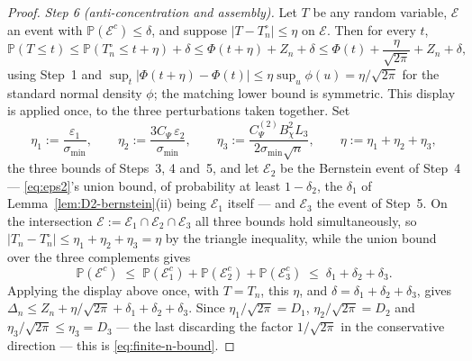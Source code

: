 \documentclass[11pt]{article}
\theoremstyle{plain}
\theoremstyle{definition}
\theoremstyle{remark}
\newcommand{\PP}{\mathbb{P}}
\begin{document}
\begin{proof}
\emph{Step 6 (anti-concentration and assembly).} Let $T$ be any random variable,
$\mathcal E$ an event with $\PP(\mathcal E^c)\le\delta$, and suppose
$|T-T_n^\circ|\le\eta$ on $\mathcal E$. Then for every $t$,
\[
    \PP(T\le t)\le\PP(T_n^\circ\le t+\eta)+\delta\le\Phi(t+\eta)+Z_n+\delta\le\Phi(t)+\frac\eta{\sqrt{2\pi}}+Z_n+\delta,
\]
using Step~1 and $\sup_t|\Phi(t+\eta)-\Phi(t)|\le\eta\sup_u\phi(u)=\eta/\sqrt{2\pi}$ for
the standard normal density $\phi$; the matching lower bound is symmetric. This display is
applied once, to the three perturbations taken together. Set
\[
    \eta_1:=\frac{\varepsilon_1}{\sigma_{\min}},\qquad
    \eta_2:=\frac{3C_\Psi\,\varepsilon_2}{\sigma_{\min}},\qquad
    \eta_3:=\frac{C^{(2)}_\Psi B_\chi^2L_3}{2\sigma_{\min}\sqrt n},\qquad
    \eta:=\eta_1+\eta_2+\eta_3,
\]
the three bounds of Steps~3, 4 and~5, and let $\mathcal E_2$ be the Bernstein event of
Step~4 --- \eqref{eq:eps2}'s union bound, of probability at least $1-\delta_2$, the
$\delta_1$ of Lemma~\ref{lem:D2-bernstein}(ii) being $\mathcal E_1$ itself --- and
$\mathcal E_3$ the event of Step~5. On the intersection
$\mathcal E:=\mathcal E_1\cap\mathcal E_2\cap\mathcal E_3$ all three bounds hold
simultaneously, so $|T_n-T_n^\circ|\le\eta_1+\eta_2+\eta_3=\eta$ by the triangle
inequality, while the union bound over the three complements gives
\[
    \PP(\mathcal E^c)\;\le\;\PP(\mathcal E_1^c)+\PP(\mathcal E_2^c)+\PP(\mathcal E_3^c)\;\le\;\delta_1+\delta_2+\delta_3 .
\]
Applying the display above once, with $T=T_n$, this $\eta$, and
$\delta=\delta_1+\delta_2+\delta_3$, gives
$\Delta_n\le Z_n+\eta/\sqrt{2\pi}+\delta_1+\delta_2+\delta_3$. Since
$\eta_1/\sqrt{2\pi}=D_1$, $\eta_2/\sqrt{2\pi}=D_2$ and
$\eta_3/\sqrt{2\pi}\le\eta_3=D_3$ --- the last discarding the factor $1/\sqrt{2\pi}$ in
the conservative direction --- this is \eqref{eq:finite-n-bound}.


\end{proof}
\end{document}
